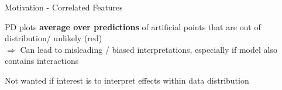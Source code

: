 \documentclass[10pt,compress,t,notes=noshow, xcolor=table]{beamer}
\begin{document}
\begin{framev}[align=top]{Motivation - Correlated Features}
\begin{itemizeM}
\item PD plots \textbf{average over predictions} of artificial points that are out of distribution/ unlikely (red)\\
$\Rightarrow$ Can lead to misleading / biased interpretations, especially if model also contains interactions
\item Not wanted if interest is to interpret effects within data distribution
\end{itemizeM}
\end{framev}
\end{document}
